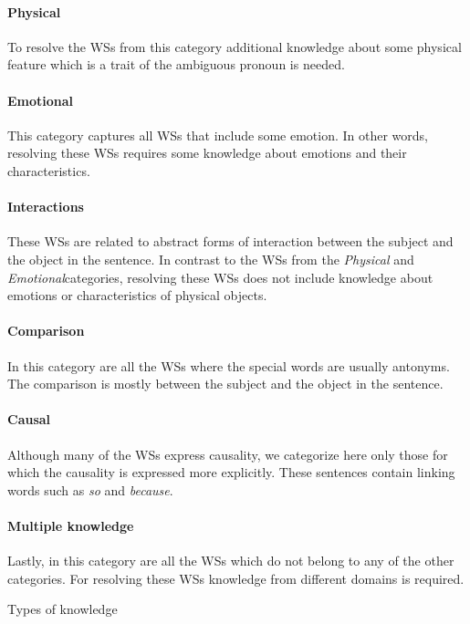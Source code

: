 \paragraph{Physical} To resolve the WSs from this category additional knowledge about some physical feature which is a trait of the ambiguous pronoun is needed.
 
\paragraph{Emotional} This category captures all WSs that include some emotion. In other words, resolving these WSs requires some knowledge about emotions and their characteristics.

\paragraph{Interactions} These WSs are related to abstract forms of interaction between the subject and the object in the sentence. In contrast to the WSs from the \textit{Physical} and \textit{Emotional}categories, resolving these WSs does not include knowledge about emotions or characteristics of physical objects.

\paragraph{Comparison} In this category are all the WSs where the special words are usually antonyms. The comparison is mostly between the subject and the object in the sentence. 

\paragraph{Causal} Although many of the WSs express causality, we categorize here only those for which the causality is expressed more explicitly. These sentences contain linking words such as \textit{so} and \textit{because}.

\paragraph{Multiple knowledge} Lastly, in this category are all the WSs which do not belong to any of the other categories. For resolving these WSs knowledge from different domains is required.

\begin{table}
	 
	\caption{{\label{types}}Types of knowledge}
\end{table}

